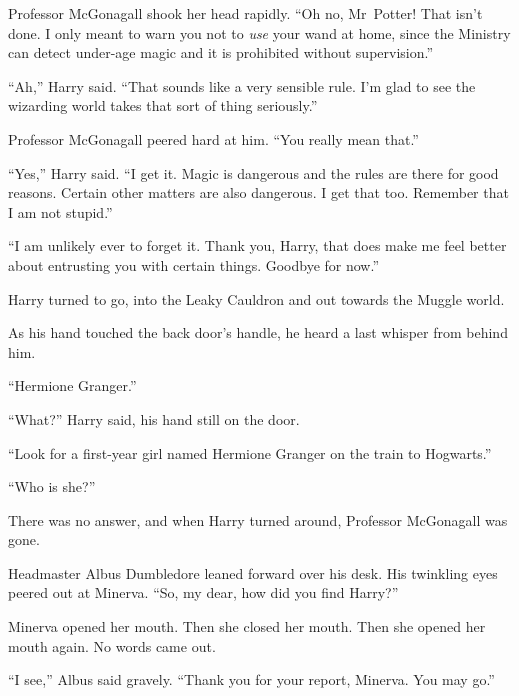 Professor McGonagall shook her head rapidly. “Oh no, Mr~Potter! That isn’t done. I only meant to warn you not to \emph{use} your wand at home, since the Ministry can detect under-age magic and it is prohibited without supervision.”

“Ah,” Harry said. “That sounds like a very sensible rule. I’m glad to see the wizarding world takes that sort of thing seriously.”

Professor McGonagall peered hard at him. “You really mean that.”

“Yes,” Harry said. “I get it. Magic is dangerous and the rules are there for good reasons. Certain other matters are also dangerous. I get that too. Remember that I am not stupid.”

“I am unlikely ever to forget it. Thank you, Harry, that does make me feel better about entrusting you with certain things. Goodbye for now.”

Harry turned to go, into the Leaky Cauldron and out towards the Muggle world.

As his hand touched the back door’s handle, he heard a last whisper from behind him.

“Hermione Granger.”

“What?” Harry said, his hand still on the door.

“Look for a first-year girl named Hermione Granger on the train to Hogwarts.”

“Who is she?”

There was no answer, and when Harry turned around, Professor McGonagall was gone.


Headmaster Albus Dumbledore leaned forward over his desk. His twinkling eyes peered out at Minerva. “So, my dear, how did you find Harry?”

Minerva opened her mouth. Then she closed her mouth. Then she opened her mouth again. No words came out.

“I see,” Albus said gravely. “Thank you for your report, Minerva. You may go.”

